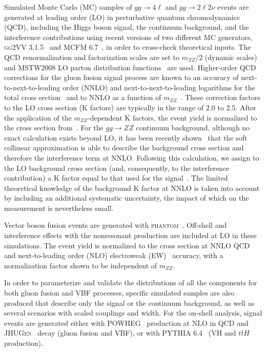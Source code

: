 Simulated Monte Carlo (MC) samples of $gg \to 4\ell$ and $gg \to 2\ell 2\nu$ events are
generated at leading order (LO) in perturbative quantum chromodynamics (QCD), including the Higgs
boson signal, the continuum background, and the interference contributions using recent versions of
two different MC generators, \textsc{gg2VV} 3.1.5~\cite{Kauer:2012hd,Kauer:2013qba} and
\textsc{MCFM 6.7}~\cite{Campbell:2010ff}, in order to cross-check theoretical inputs. The QCD renormalization
and factorization scales are set to $m_{ZZ}/2$ (dynamic scales) and \textsc{MSTW2008} LO parton distribution
functions~\cite{Martin:2009iq} are used. Higher-order QCD corrections for the gluon fusion signal process
are known to an accuracy of next-to-next-to-leading order (NNLO) and next-to-next-to-leading logarithms
for the total cross section~\cite{Dittmaier:2011ti,Heinemeyer:2013tqa} and to
NNLO as a function of $m_{ZZ}$~\cite{Passarino:2013bha}.
These correction factors to the LO cross section (K factors) are typically in the range of 2.0 to 2.5.
After the application of the $m_{ZZ}$-dependent K factors, the event yield is normalized to the cross
section from~\cite{Dittmaier:2011ti,Heinemeyer:2013tqa}.
For the $gg \to ZZ$ continuum background, although no exact calculation exists beyond LO,
it has been recently shown~\cite{Bonvini:2013jha} that the soft collinear approximation is able to
describe the background cross section and therefore the interference term at NNLO. Following this
calculation, we assign to the LO background cross section (and, consequently, to the interference
contribution) a K factor equal to that used for the signal~\cite{Passarino:2013bha}. The limited
theoretical knowledge of the background K factor at NNLO is taken into account by including an additional
systematic uncertainty, the impact of which on the measurement is nevertheless small.

Vector boson fusion events are generated with \textsc{phantom}~\cite{Ballestrero:2007xq}.
Off-shell and interference effects with the nonresonant production are included at LO in these simulations.
The event yield is normalized to the cross section at NNLO QCD and next-to-leading order (NLO)
electroweak (EW)~\cite{Dittmaier:2011ti,Heinemeyer:2013tqa} accuracy, with
a normalization factor shown to be independent of $m_{ZZ}$.

In order to parameterize and validate the distributions of all the components for both gluon fusion and
VBF processes, specific simulated samples are also produced that describe only the signal or the continuum background,
as well as several scenarios with scaled couplings and width. For the on-shell analysis, signal events
are generated either with \textsc{POWHEG}~\cite{Frixione:2007vw,Alioli:2010xd,Bagnaschi:2011tu,Nason:2009ai} production at NLO in QCD and \textsc{JHUGen}~\cite{Gao:2010qx, Bolognesi:2012mm, Anderson:2013afp}
decay (gluon fusion and VBF), or with \textsc{PYTHIA} 6.4~\cite{Sjostrand:2006za} (VH and $t\bar{t}H$ production).

